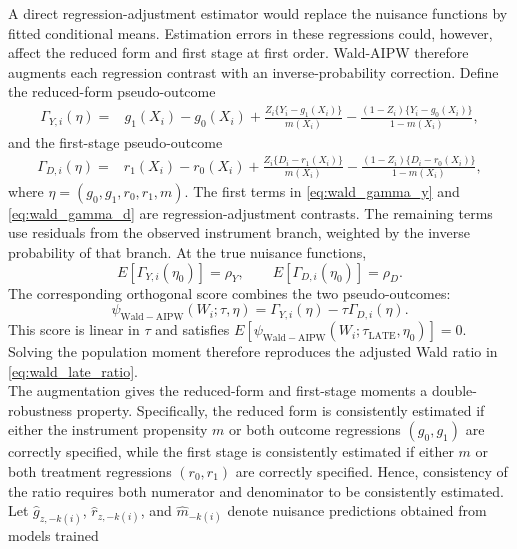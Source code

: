 \documentclass[12pt, a4paper, oneside]{article}
\theoremstyle{plain}
\theoremstyle{definition}
\begin{document}
A direct regression-adjustment estimator would replace the nuisance functions
by fitted conditional means. Estimation errors in these regressions could,
however, affect the reduced form and first stage at first order. Wald-AIPW
therefore augments each regression contrast with an inverse-probability
correction. Define the reduced-form pseudo-outcome
\begin{align}
    \Gamma_{Y,i}(\eta)
    ={}&g_1(X_i)-g_0(X_i)
      +\frac{Z_i\{Y_i-g_1(X_i)\}}{m(X_i)}
      -\frac{(1-Z_i)\{Y_i-g_0(X_i)\}}{1-m(X_i)},
    \label{eq:wald_gamma_y}
\end{align}
and the first-stage pseudo-outcome
\begin{align}
    \Gamma_{D,i}(\eta)
    ={}&r_1(X_i)-r_0(X_i)
      +\frac{Z_i\{D_i-r_1(X_i)\}}{m(X_i)}
      -\frac{(1-Z_i)\{D_i-r_0(X_i)\}}{1-m(X_i)},
    \label{eq:wald_gamma_d}
\end{align}
where $\eta=(g_0,g_1,r_0,r_1,m)$.
The first terms in
\eqref{eq:wald_gamma_y} and \eqref{eq:wald_gamma_d} are regression-adjustment
contrasts. 
The remaining terms use
residuals from the observed instrument branch, weighted by the inverse
probability of that branch. 
At the true nuisance functions,
\begin{equation}
    E[\Gamma_{Y,i}(\eta_0)]=\rho_Y,
    \qquad
    E[\Gamma_{D,i}(\eta_0)]=\rho_D.
\end{equation}
The corresponding orthogonal score combines the two pseudo-outcomes:
\begin{equation}
    \psi_{\mathrm{Wald-AIPW}}(W_i;\tau,\eta)
    =\Gamma_{Y,i}(\eta)-\tau\Gamma_{D,i}(\eta).
    \label{eq:wald_aipw_score}
\end{equation}
This score is linear in \(\tau\) and satisfies
$
    E[
      \psi_{\mathrm{Wald-AIPW}}
      (W_i;\tau_{\mathrm{LATE}},\eta_0)
    ]=0.$
Solving the population moment therefore reproduces the adjusted Wald ratio in
\eqref{eq:wald_late_ratio}.\\
The augmentation gives the reduced-form and first-stage moments a
double-robustness property. Specifically, the reduced form is consistently
estimated if either the instrument propensity \(m\) or both outcome regressions
\((g_0,g_1)\) are correctly specified, while the first stage is consistently
estimated if either \(m\) or both treatment regressions \((r_0,r_1)\) are
correctly specified. Hence, consistency of the ratio requires both numerator
and denominator to be consistently estimated.
Let \(\widehat g_{z,-k(i)}\), \(\widehat r_{z,-k(i)}\), and
\(\widehat m_{-k(i)}\) denote nuisance predictions obtained from models trained
\end{document}
